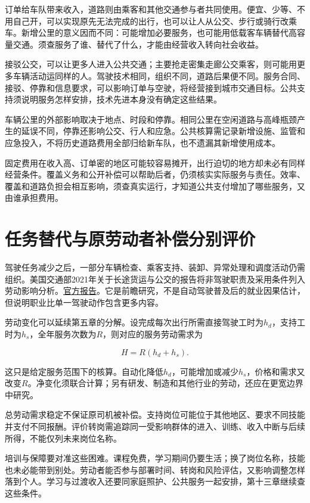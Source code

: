 \documentclass[UTF8,fontset=windows,12pt,a4paper,oneside,openany]{ctexbook}
\begin{document}
订单给车队带来收入，道路则由乘客和其他交通参与者共同使用。便宜、少等、不用自己开，可以实现原先无法完成的出行，也可以让人从公交、步行或骑行改乘车。新增公里的意义因而不同：可能增加必要服务，也可能用低载客车辆替代高容量交通。须查服务了谁、替代了什么，才能由经营收入转向社会收益。

接驳公交，可以让更多人进入公共交通；主要抢走密集走廊公交乘客，则可能用更多车辆活动运同样的人。驾驶技术相同，组织不同，道路后果便不同。服务合同、接驳、停靠和信息要求，可以影响订单与空驶，将经营接到城市交通目标。公共支持须说明服务怎样安排，技术先进本身没有确定这些结果。

车辆公里的外部影响取决于地点、时段和停靠。相同公里在空闲道路与高峰瓶颈产生的延误不同，停靠还影响公交、行人和应急。公共核算需记录新增设施、监管和应急投入，不将历史道路费用全部归给新车队，也不遗漏其新增使用成本。

固定费用在收入高、订单密的地区可能较容易摊开，出行迫切的地方却未必有同样经营条件。覆盖义务和公开补偿可以帮助后者，仍须核实实际服务与责任。效率、覆盖和道路负担会相互影响，须查真实运行，才知道公共支付增加了哪些服务，又由谁承担费用。

\section{任务替代与原劳动者补偿分别评价}

驾驶任务减少之后，一部分车辆检查、乘客支持、装卸、异常处理和调度活动仍需组织。美国交通部2021年关于长途货运与公交的报告将非驾驶职责及采用条件列入劳动影响分析。\href{https://www.transportation.gov/av/workforce/report}{官方报告}。它是前瞻研究，不是自动驾驶普及后的就业因果估计，但说明职业比单一驾驶动作包含更多内容。

劳动变化可以延续第五章的分解。设完成每次出行所需直接驾驶工时为\(h_d\)，支持工时为\(h_s\)，全年服务次数为\(R\)，则对应的服务劳动需求为

\[
H=R(h_d+h_s).
\tag{10-8}
\]

这只是给定服务范围下的核算。自动化降低\(h_d\)，可能增加或减少\(h_s\)，价格和需求又改变\(R\)。净变化须联合计算；另有研发、制造和其他行业的劳动，还应在更宽边界中研究。

总劳动需求稳定不保证原司机被补偿。支持岗位可能位于其他地区、要求不同技能并支付不同报酬。评价转岗需追踪同一受影响群体的进入、训练、收入中断与后续所得，不能仅列未来岗位名称。

培训与保障要对准这些困难。课程免费，学习期间仍要生活；换了岗位名称，技能也未必能带到别处。劳动者能否参与部署时间、转岗和风险评估，又影响调整怎样落到个人。学习与过渡收入还要同家庭照护、公共服务一起安排，第十三章继续查这些条件。
\end{document}

